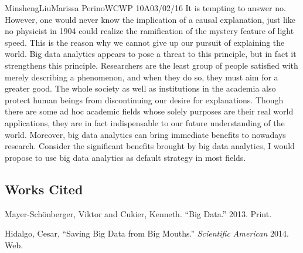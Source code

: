 \documentclass[12pt,letterpaper]{article}
\begin{document}
\begin{mla}{Minsheng}{Liu}{Marissa Perino}{WCWP 10A}{03/02/16}
It is tempting to answer no. However, one would never know the
implication of a causal explanation, just like no physicist in 1904
could realize the ramification of the mystery feature of light speed.
This is the reason why we cannot give up our pursuit of explaining the
world. Big data analytics appears to pose a threat to this principle,
but in fact it strengthens this principle. Researchers are the least
group of people satisfied with merely describing a phenomenon, and when
they do so, they must aim for a greater good. The whole society as well
as institutions in the academia also protect human beings from
discontinuing our desire for explanations. Though there are some ad hoc
academic fields whose solely purposes are their real world applications,
they are in fact indispensable to our future understanding of the world.
Moreover, big data analytics can bring immediate benefits to nowadays
research. Consider the significant benefits brought by big data
analytics, I would propose to use big data analytics as default strategy
in most fields.

\subsection*{Works Cited}
\bibent Mayer-Schönberger, Viktor and Cukier, Kenneth. ``Big Data.'' 2013. Print.

\bibent Hidalgo, Cesar, ``Saving Big Data from Big Mouths.'' \textit{Scientific American} 2014. Web.

\end{mla}
\end{document}
